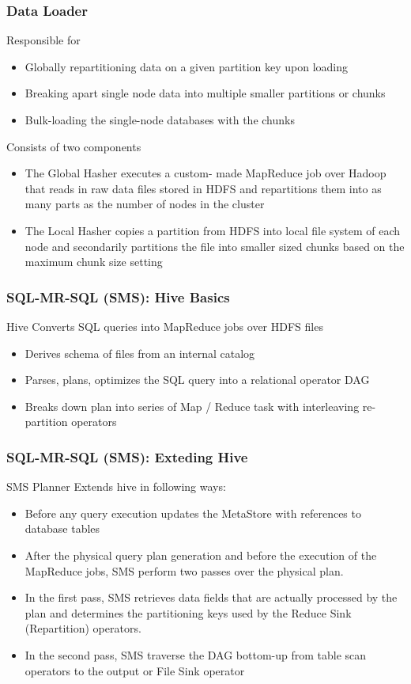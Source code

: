 \documentclass{beamer}
\begin{document}
\begin{frame}
  \frametitle{Data Loader}
  Responsible for
  \begin{itemize}
  \item Globally repartitioning data on a given partition key upon
    loading
  \item Breaking apart single node data into multiple smaller
    partitions or chunks
  \item Bulk-loading the single-node databases with the chunks
  \end{itemize}
Consists of two components
\begin{itemize}
\item The Global Hasher executes a custom- made MapReduce job over
  Hadoop that reads in raw data files stored in HDFS and repartitions
  them into as many parts as the number of nodes in the cluster
\item The Local Hasher copies a partition from HDFS into local file system of each node and secondarily partitions the file into smaller sized chunks based on the maximum chunk size setting
\end{itemize}
\end{frame}

\begin{frame}
  \frametitle{SQL-MR-SQL (SMS): Hive Basics}
  Hive Converts SQL queries into MapReduce jobs over HDFS files
  \begin{itemize}
  \item Derives schema of files from an internal catalog
  \item Parses, plans, optimizes the SQL query into a relational
    operator DAG
  \item Breaks down plan into series of Map / Reduce task with
    interleaving re-partition operators
  \end{itemize}
\end{frame}


\begin{frame}
  \frametitle{SQL-MR-SQL (SMS): Exteding Hive}
  SMS Planner Extends hive in following ways:
  \begin{itemize}
  \item Before any query execution updates the MetaStore with references to database tables
  \item After the physical query plan generation and before the
    execution of the MapReduce jobs, SMS perform two passes over the
    physical plan.
  \item In the first pass, SMS retrieves data fields that are actually
    processed by the plan and determines the partitioning keys used by
    the Reduce Sink (Repartition) operators.
  \item In the second pass, SMS traverse the DAG bottom-up from table scan operators to the output or File Sink operator
  \end{itemize}
\end{frame}
\end{document}
